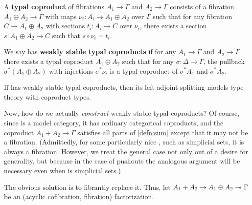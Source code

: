 \documentclass{amsart}
\begin{document}
\begin{defn}\label{defn:sum}
  A \textbf{typal coproduct} of fibrations $A_1\to \Gamma$ and $A_2\to\Gamma$ consists of a fibration $A_1\oplus A_2 \to\Gamma$ with maps $\nu_i: A_i \to A_1\oplus A_2$ over $\Gamma$ such that for any fibration $C\to A_1\oplus A_2$ with sections $t_i : A_i \to C$ over $\nu_i$, there exists a section $s:A_1\oplus A_2 \to C$ such that $s\circ \nu_i = t_i$.

  We say \sM has \textbf{weakly stable typal coproducts} if for any $A_1\to \Gamma$ and $A_2\to\Gamma$ there exists a typal coproduct $A_1\oplus A_2$ such that for any $\sigma:\Delta\to\Gamma$, the pullback $\sigma^*(A_1\oplus A_2)$ with injections $\sigma^*\nu_i$ is a typal coproduct of $\sigma^*A_1$ and $\sigma^* A_2$.
\end{defn}

\begin{thm}
  If \sM has weakly stable typal coproducts, then its left adjoint splitting models type theory with coproduct types.
\end{thm}

Now, how do we actually \emph{construct} weakly stable typal coproducts?
Of course, since \sM is a model category, it has ordinary categorical coproducts, and the coproduct $A_1 + A_2 \to \Gamma$ satisfies all parts of \cref{defn:sum} except that it may not be a fibration.
(Admittedly, for some particularly nice \sM, such as simplicial sets, it is always a fibration.
However, we treat the general case not only out of a desire for generality, but because in the case of pushouts the analogous argument will be necessary even when \sM is simplicial sets.)

The obvious solution is to fibrantly replace it.
Thus, let $A_1 + A_2 \to A_1\oplus A_2 \twoheadrightarrow \Gamma$ be an (acyclic cofibration, fibration) factorization.
\end{document}
